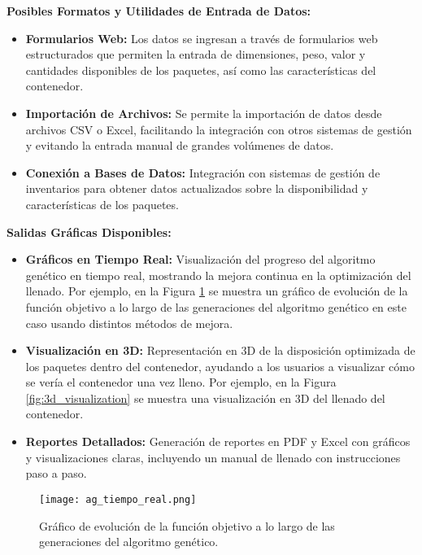 \documentclass[9pt,a4paper]{rho}
\begin{document}
\textbf{Posibles Formatos y Utilidades de Entrada de Datos:}
\begin{itemize}[itemsep=.5em]
    \item \textbf{Formularios Web:} Los datos se ingresan a través de formularios web estructurados que permiten la entrada de dimensiones, peso, valor y cantidades disponibles de los paquetes, así como las características del contenedor.
    \item \textbf{Importación de Archivos:} Se permite la importación de datos desde archivos CSV o Excel, facilitando la integración con otros sistemas de gestión y evitando la entrada manual de grandes volúmenes de datos.
    \item \textbf{Conexión a Bases de Datos:} Integración con sistemas de gestión de inventarios para obtener datos actualizados sobre la disponibilidad y características de los paquetes.
\end{itemize}

\newpage

\textbf{Salidas Gráficas Disponibles:}
\begin{itemize}[itemsep=.5em]
    \item \textbf{Gráficos en Tiempo Real:} Visualización del progreso del algoritmo genético en tiempo real, mostrando la mejora continua en la optimización del llenado. Por ejemplo, en la Figura \ref{fig:ag_tiempo_real} se muestra un gráfico de evolución de la función objetivo a lo largo de las generaciones del algoritmo genético en este caso usando distintos métodos de mejora.
    \item \textbf{Visualización en 3D:} Representación en 3D de la disposición optimizada de los paquetes dentro del contenedor, ayudando a los usuarios a visualizar cómo se vería el contenedor una vez lleno. Por ejemplo, en la Figura \ref{fig:3d_visualization} se muestra una visualización en 3D del llenado del contenedor.
    \item \textbf{Reportes Detallados:} Generación de reportes en PDF y Excel con gráficos y visualizaciones claras, incluyendo un manual de llenado con instrucciones paso a paso.
\end{itemize}

\begin{figure}[h!]
    \centering
    \texttt{[image: ag\_tiempo\_real.png]}
    \caption{Gráfico de evolución de la función objetivo a lo largo de las generaciones del algoritmo genético.}
    \label{fig:ag_tiempo_real}
\end{figure}
\end{document}
